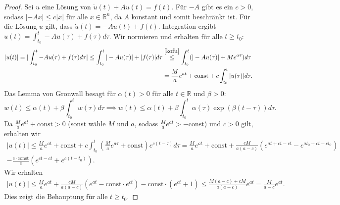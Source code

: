 \documentclass[10pt,a4paper]{article}
\begin{document}
\begin{proof}
	Sei $u$ eine Lösung von $\dot u(t) + Au(t) = f(t)$. Für $-A$ gibt es ein $c >0$, sodass $|-Ax| \leq c|x|$ für alle $x \in \mathbb R^n$, da $A$ konstant und somit beschränkt ist. Für die Lösung $u$ gilt, dass $\dot u(t) = -Au(t)+f(t)$. Integration ergibt $u(t) = \int^t_{t_0}-Au(\tau)+f(\tau)d\tau$. Wir normieren und erhalten für alle $t \geq t_0$:
	\begin{align*}
		|u(t)| = |\int^t_{t_0}-Au(\tau)+f(\tau)d\tau| \leq \int^t_{t_0}|-Au(\tau)|+|f(\tau)|d\tau &\overset{\eqref{kofu}}{\leq} \int^t_{t_0}(|-Au(\tau)|+Me^{a\tau})d\tau \\
		&= \frac{M}{a}e^{at} + \mathrm{const} + c \int^t_{t_0} |u(\tau)| d\tau.
	\end{align*}
	Das Lemma von Gronwall besagt für $\alpha(t) > 0$ für alle $t \in \mathbb R$ und $\beta > 0$:
	\[
		w(t) \leq \alpha(t) + \beta \int^t_{t_0}w(\tau)d\tau \implies w(t) \leq \alpha(t) + \beta \int^t_{t_0}\alpha(\tau)\exp(\beta(t-\tau))d\tau.
	\]
	Da $ \frac{M}{a}e^{at} + \mathrm{const} > 0$ (sonst wähle $M$ und $a$, sodass $ \frac{M}{a}e^{at} > - \mathrm{const}$) und $c > 0$ gilt, erhalten wir
	\begin{align*}
		|u(t)| \leq \frac{M}{a}e^{at} + \mathrm{const} + c \int^t_{t_0} (\frac{M}{a}e^{a\tau} + \mathrm{const})e^{c(t-\tau)}d\tau = \frac{M}{a}e^{at} + \mathrm{const}+\frac{cM}{a(a-c)}(e^{at+ct-ct}-e^{at_0+ct-ct_0}) \\ 
		- \frac{c \cdot \mathrm{const}}{c}(e^{ct-ct} + e^{c(t-t_0)}).
	\end{align*}
	Wir erhalten
	\begin{align*}
		|u(t)| \leq \frac{M}{a}e^{at}+\frac{cM}{a(a-c)}(e^{at}-\mathrm{const}\cdot e^{ct})
		- \mathrm{const}\cdot( e^{ct} + 1) \leq \frac{M(a-c)+cM}{a(a-c)}e^{at} = \frac{M}{a-c}e^{at}.
	\end{align*}
	Dies zeigt die Behauptung für alle $t\geq t_0$.
\end{proof}
\end{document}
